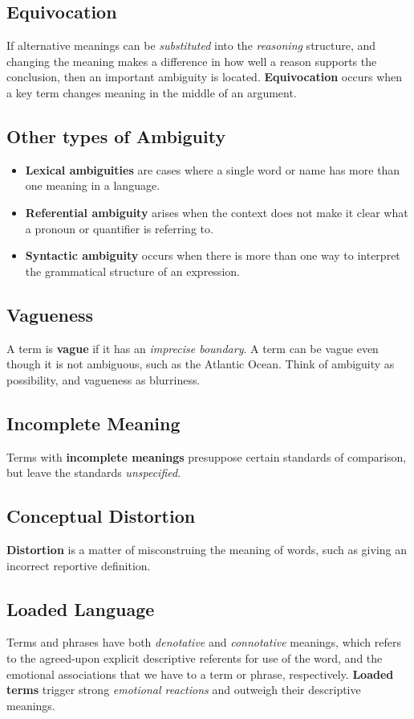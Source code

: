 \documentclass{article}
\begin{document}
\subsection{Equivocation}
If alternative meanings can be \emph{substituted} into the \emph{reasoning} structure, and changing the meaning makes a difference in how well a reason supports the conclusion, then an important ambiguity is located. \textbf{Equivocation} occurs when a key term changes meaning in the middle of an argument.

\subsection{Other types of Ambiguity}
\begin{itemize}
  \item \textbf{Lexical ambiguities} are cases where a single word or name has more than one meaning in a language.
  \item \textbf{Referential ambiguity} arises when the context does not make it clear what a pronoun or quantifier is referring to.
  \item \textbf{Syntactic ambiguity} occurs when there is more than one way to interpret the grammatical structure of an expression. 
\end{itemize}

\subsection{Vagueness}
A term is \textbf{vague} if it has an \emph{imprecise boundary}. A term can be vague even though it is not ambiguous, such as the Atlantic Ocean. Think of ambiguity as possibility, and vagueness as blurriness.

\subsection{Incomplete Meaning}
Terms with \textbf{incomplete meanings} presuppose certain standards of comparison, but leave the standards \emph{unspecified}.

\subsection{Conceptual Distortion}
\textbf{Distortion} is a matter of misconstruing the meaning of words, such as giving an incorrect reportive definition.

\subsection{Loaded Language}
Terms and phrases have both \emph{denotative} and \emph{connotative} meanings, which refers to the agreed-upon explicit descriptive referents for use of the word, and the emotional associations that we have to a term or phrase, respectively. \textbf{Loaded terms} trigger strong \emph{emotional reactions} and outweigh their descriptive meanings.
\end{document}
